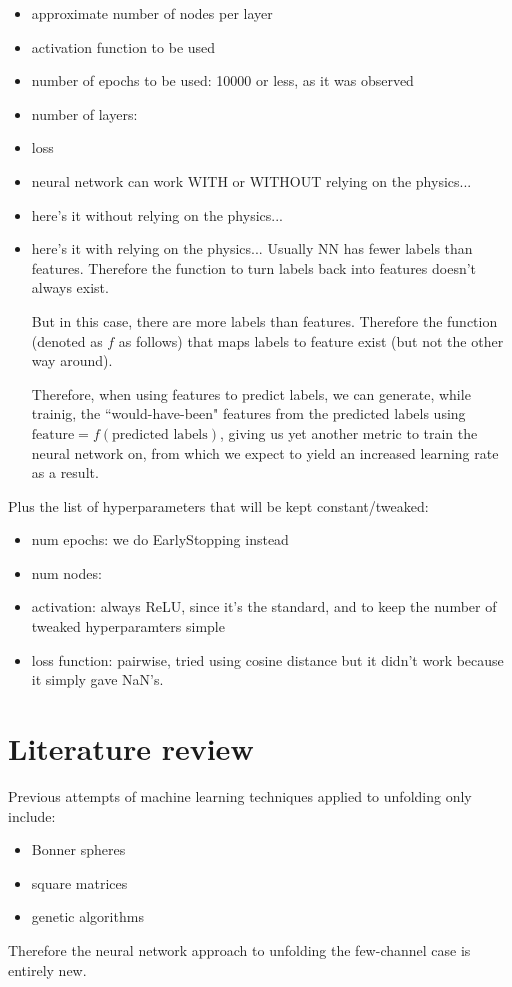 \documentclass[a4paper, 12pt]{article}
\begin{document}
    \begin{itemize}
        \item approximate number of nodes per layer
        \item activation function to be used
        \item number of epochs to be used: 10000 or less, as it was observed
        \item number of layers:
        \item loss
    \end{itemize}
    \begin{itemize}
        \item neural network can work WITH or WITHOUT relying on the physics...
        \item here's it without relying on the physics...
        \item here's it with relying on the physics...
        Usually NN has fewer labels than features. Therefore the function to turn labels back into features doesn't always exist.

        But in this case, there are more labels than features. Therefore the function (denoted as $f$ as follows) that maps labels to feature exist (but not the other way around).
        
        Therefore, when using features to predict labels, we can generate, while trainig, the ``would-have-been" features from the predicted labels using $\text{feature}=f(\text{predicted labels})$, giving us yet another metric to train the neural network on, from which we expect to yield an increased learning rate as a result.
    \end{itemize}
    
    Plus the list of hyperparameters that will be kept constant/tweaked:
    \begin{itemize}
        \item num epochs: we do EarlyStopping instead
        \item num nodes:
        \item activation: always ReLU, since it's the standard, and to keep the number of tweaked hyperparamters simple
        \item loss function: pairwise, tried using cosine distance but it didn't work because it simply gave NaN's.
    \end{itemize}

\section{Literature review}
Previous attempts of machine learning techniques applied to unfolding only include:
\begin{itemize}
    \item Bonner spheres
    \item square matrices
    \item genetic algorithms
\end{itemize}
Therefore the neural network approach to unfolding the few-channel case is entirely new.
\end{document}
